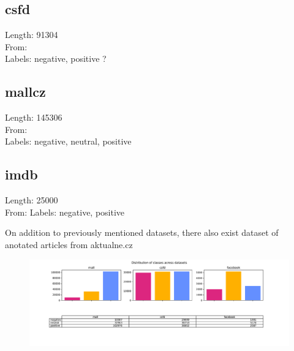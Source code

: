 \subsection{csfd}
Length: 91304 \\
From: \\
Labels: negative, positive ? \\

\subsection{mallcz}
Length: 145306 \\
From: \\
Labels: negative, neutral, positive

\subsection{imdb}
Length: 25000 \\
From:
Labels: negative, positive


On addition to previously mentioned datasets, there also exist dataset of anotated articles from aktualne.cz %


\begin{figure}[h]
\centering
\includegraphics[width=1\columnwidth]{../img/distribution}
\protect\caption{}
\label{pic:dist}
\end{figure}


